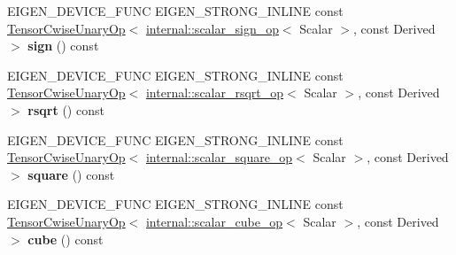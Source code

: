 \begin{DoxyCompactItemize}
\item 
\mbox{\label{class_eigen_1_1_tensor_base_3_01_derived_00_01_read_only_accessors_01_4_af2bc2f69fc6bd6cecedf6abb390435a2}} 
E\+I\+G\+E\+N\+\_\+\+D\+E\+V\+I\+C\+E\+\_\+\+F\+U\+NC E\+I\+G\+E\+N\+\_\+\+S\+T\+R\+O\+N\+G\+\_\+\+I\+N\+L\+I\+NE const \hyperlink{class_eigen_1_1_tensor_cwise_unary_op}{Tensor\+Cwise\+Unary\+Op}$<$ \hyperlink{struct_eigen_1_1internal_1_1scalar__sign__op}{internal\+::scalar\+\_\+sign\+\_\+op}$<$ Scalar $>$, const Derived $>$ {\bfseries sign} () const
\item 
\mbox{\label{class_eigen_1_1_tensor_base_3_01_derived_00_01_read_only_accessors_01_4_a7af2b96b287ac5ee3f6ac042f704f9ef}} 
E\+I\+G\+E\+N\+\_\+\+D\+E\+V\+I\+C\+E\+\_\+\+F\+U\+NC E\+I\+G\+E\+N\+\_\+\+S\+T\+R\+O\+N\+G\+\_\+\+I\+N\+L\+I\+NE const \hyperlink{class_eigen_1_1_tensor_cwise_unary_op}{Tensor\+Cwise\+Unary\+Op}$<$ \hyperlink{struct_eigen_1_1internal_1_1scalar__rsqrt__op}{internal\+::scalar\+\_\+rsqrt\+\_\+op}$<$ Scalar $>$, const Derived $>$ {\bfseries rsqrt} () const
\item 
\mbox{\label{class_eigen_1_1_tensor_base_3_01_derived_00_01_read_only_accessors_01_4_a4419063a0b3bc9e950eba9eb15c75ac4}} 
E\+I\+G\+E\+N\+\_\+\+D\+E\+V\+I\+C\+E\+\_\+\+F\+U\+NC E\+I\+G\+E\+N\+\_\+\+S\+T\+R\+O\+N\+G\+\_\+\+I\+N\+L\+I\+NE const \hyperlink{class_eigen_1_1_tensor_cwise_unary_op}{Tensor\+Cwise\+Unary\+Op}$<$ \hyperlink{struct_eigen_1_1internal_1_1scalar__square__op}{internal\+::scalar\+\_\+square\+\_\+op}$<$ Scalar $>$, const Derived $>$ {\bfseries square} () const
\item 
\mbox{\label{class_eigen_1_1_tensor_base_3_01_derived_00_01_read_only_accessors_01_4_a7a4e54f4680569671f682b0a96829a72}} 
E\+I\+G\+E\+N\+\_\+\+D\+E\+V\+I\+C\+E\+\_\+\+F\+U\+NC E\+I\+G\+E\+N\+\_\+\+S\+T\+R\+O\+N\+G\+\_\+\+I\+N\+L\+I\+NE const \hyperlink{class_eigen_1_1_tensor_cwise_unary_op}{Tensor\+Cwise\+Unary\+Op}$<$ \hyperlink{struct_eigen_1_1internal_1_1scalar__cube__op}{internal\+::scalar\+\_\+cube\+\_\+op}$<$ Scalar $>$, const Derived $>$ {\bfseries cube} () const
\item 

\end{DoxyCompactItemize}
